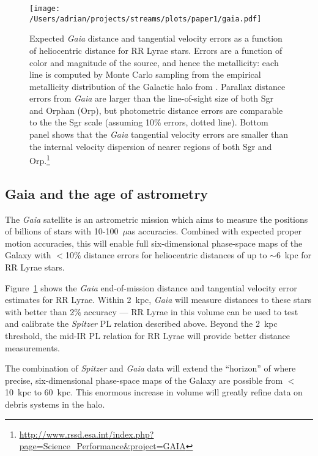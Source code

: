 \documentclass{emulateapj}
\begin{document}
\begin{figure}[h!]
\begin{center}
\texttt{[image: /Users/adrian/projects/streams/plots/paper1/gaia.pdf]}

\caption{Expected {\it Gaia} distance and tangential velocity errors as a function of heliocentric distance for RR Lyrae stars. Errors are a function of color and magnitude of the source, and hence the metallicity: each line is computed
by Monte Carlo sampling from the empirical metallicity distribution of
the Galactic halo from \cite{ivezic08}. Parallax distance errors from {\it Gaia} are larger than the line-of-sight size of both Sgr and Orphan (Orp), but photometric distance errors are comparable to the the Sgr scale (assuming 10\% errors, dotted line). Bottom panel shows that the {\it Gaia} tangential velocity errors are smaller than the internal velocity dispersion of nearer regions of both Sgr and Orp.\footnote{\url{http://www.rssd.esa.int/index.php?page=Science_Performance&project=GAIA}} }\label{fig:gaia_errors}
\end{center}
\end{figure}

\subsection{Gaia and the age of astrometry}
\label{sec:gaia}
The {\it Gaia} satellite \citep{gaia01} is
an astrometric mission which aims to measure the positions of billions
of stars with 10-100~$\mu$as accuracies. Combined with expected 
proper motion accuracies, this will enable full six-dimensional phase-space 
maps of the Galaxy with $<$10\% distance errors for heliocentric distances of
up to $\sim$6~kpc for RR Lyrae stars.

Figure~\ref{fig:gaia_errors} shows the {\it Gaia} end-of-mission distance
and tangential velocity error estimates for RR Lyrae. Within 2~kpc, {\it Gaia} will measure distances to these stars with
better than 2\% accuracy --- RR Lyrae in this volume can be used to
test and calibrate the {\it Spitzer} PL relation described above. Beyond the
2~kpc threshold, the mid-IR PL relation for RR Lyrae will provide better 
distance measurements. 

The combination of {\it Spitzer} and {\it Gaia} data will 
extend the ``horizon'' of where precise, six-dimensional phase-space 
maps of the Galaxy are possible from $<$10~kpc to 60~kpc. This enormous 
increase in volume will greatly refine data on debris systems in the halo.
\end{document}
